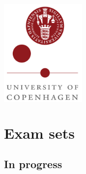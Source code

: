 \documentclass[
]{article}
\begin{document}
{\begin{titlepage}




\includegraphics[height=200px, keepaspectratio]{logo_ku.png}\\[4cm] %
 

\vfill %
\end{titlepage}
\setcounter{tocdepth}{2}
\tableofcontents
}
\thispagestyle{empty}
\newpage
\setcounter{page}{1}
\pagestyle{fancy}
\hypertarget{exam-sets}{%
\section{Exam sets}\label{exam-sets}}

\hypertarget{in-progress}{%
\subsection{In progress}\label{in-progress}}
\end{document}
